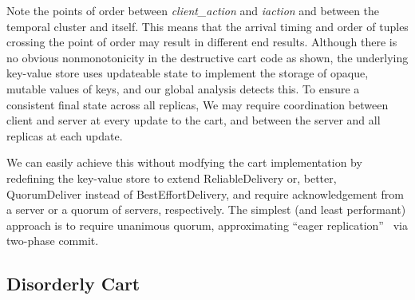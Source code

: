 Note the points of order between \emph{client\_action} and \emph{iaction}
and between the temporal cluster and itself.  This means that the arrival 
timing and order of tuples crossing the point of order may result in different
end results.  Although there is no obvious nonmonotonicity in the destructive
cart code as shown, the underlying key-value store uses updateable state
to implement the storage of opaque, mutable values of keys, and our global
analysis detects this.
To ensure a consistent final state across all replicas, We may require coordination
between client and server at every update to the cart, and between the 
server and all replicas at each update.  

We can easily achieve this without modfying the cart implementation
by redefining the key-value store to extend
ReliableDelivery or, better, QuorumDeliver instead of BestEffortDelivery, and require acknowledgement from a server or a quorum of servers, respectively.
The simplest (and least performant) approach is to require unanimous quorum,
approximating ``eager replication''~\cite{dangers} via two-phase commit.


\subsection{Disorderly Cart}

